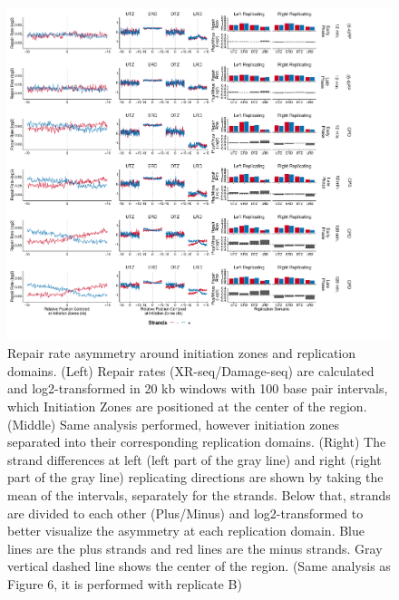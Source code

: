 \begin{figure}[H]
\begin{center}
\includegraphics[width=\textwidth]{Chapters/7_appendix/figures/supfig12}
\caption[Repair rate asymmetry around initiation zones and replication domains.]{Repair rate asymmetry around initiation zones and replication domains. (Left) Repair rates (XR-seq/Damage-seq) are calculated and log2-transformed in 20 kb windows with 100 base pair intervals, which Initiation Zones are positioned at the center of the region. (Middle) Same analysis performed, however initiation zones separated into their corresponding replication domains. (Right) The strand differences at left (left part of the gray line) and right (right part of the gray line) replicating directions are shown by taking the mean of the intervals, separately for the strands. Below that, strands are divided to each other (Plus/Minus) and log2-transformed to better visualize the asymmetry at each replication domain. Blue lines are the plus strands and red lines are the minus strands. Gray vertical dashed line shows the center of the region. (Same analysis as Figure 6, it is performed with replicate B)}
\label{supfig:repairrate}
\end{center}
\end{figure}


